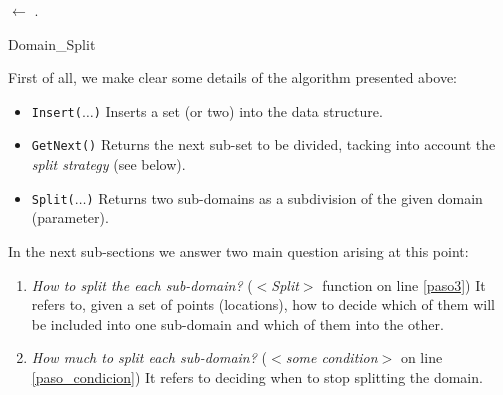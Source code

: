 \incmargin{1.4em}
\linesnumbered
\begin{algorithm}[H]
\dontprintsemicolon
\SetLine
{}

\BlankLine

\A $\leftarrow$ \Uni\;
\Q .\Insert{\A}\;
\caption{Domain\_Split}
\label{algo}
\end{algorithm}

First of all, we make clear some details of the algorithm presented above:

\begin{itemize}
\item \texttt{Insert($\dots$)} Inserts a set (or two) into the data structure. %
\item \texttt{GetNext()} Returns the next sub-set to be divided, tacking into account the {\it split strategy} (see below).
\item \texttt{Split($\dots$)} Returns two sub-domains as a subdivision of the given domain (parameter).
\end{itemize}

In the next sub-sections we answer two main question arising at this point:

\begin{enumerate}
\item \textit{How to split the each sub-domain?} ($<$\emph{Split}$>$ function on line \ref{paso3}) It refers to, given a set of points (locations), how to decide which of them will be included into one sub-domain and which of them into the other.
\item \textit{How much to split each sub-domain?} ($<$\emph{some condition}$>$ on line \ref{paso_condicion}) It refers to deciding when to stop splitting the domain.
\end{enumerate}

